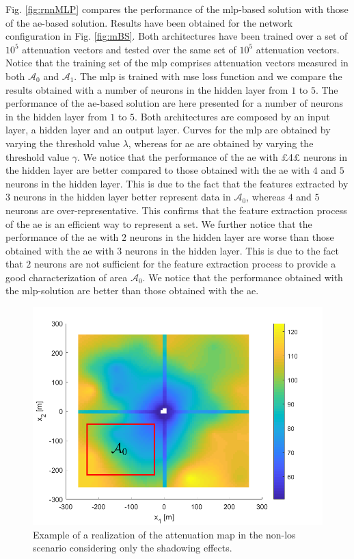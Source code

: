 \documentclass[draftcls,onecolumn,12pt]{IEEEtran}
\begin{document}
Fig. \ref{fig:rnnMLP} compares the performance of the \ac{mlp}-based solution with those of the \ac{ae}-based solution. Results have been obtained for the network configuration in Fig. \ref{fig:mBS}. Both architectures have been trained over a set of $10^5$ attenuation vectors and tested over the same set of $10^5$ attenuation vectors. Notice that the training set of the \ac{mlp} comprises attenuation vectors measured in both $\mathcal{A}_0$ and $\mathcal{A}_1$. The \ac{mlp} is trained with \ac{mse} loss function and we compare the results obtained with a number of neurons in the hidden layer from $1$ to $5$. The performance of the \ac{ae}-based solution are here presented for a number of neurons in the hidden layer from $1$ to $5$. Both architectures are composed by an input layer, a hidden layer and an output layer. Curves for the \ac{mlp} are obtained by varying the threshold value $\lambda$, whereas for \ac{ae} are obtained by varying the threshold value $\gamma$. We notice that the performance of the \ac{ae} with £4£ neurons in the hidden layer are better compared to those obtained with the \ac{ae} with $4$ and $5$ neurons in the hidden layer. This is due to the fact that the features extracted by $3$ neurons in the hidden layer better represent data in $\mathcal{A}_0$, whereas $4$ and $5$ neurons are over-representative. This confirms that the feature extraction process of the \ac{ae} is an efficient way to represent a set. We further notice that the performance of the \ac{ae} with $2$ neurons in the hidden layer are worse than those obtained with the \ac{ae} with $3$ neurons in the hidden layer. This is due to the fact that $2$ neurons are not sufficient for the feature extraction process to provide a good characterization of area $\mathcal{A}_0$. We notice that the performance obtained with the \ac{mlp}-solution are better than those obtained with the \ac{ae}. 

\begin{figure}
    \centering
    \includegraphics[width=0.5\columnwidth]{surfColorato.png}
    \caption{Example of a realization of the attenuation map in the non-\ac{los} scenario considering only the shadowing effects.}
    \label{fig:map}
\end{figure}
\end{document}
